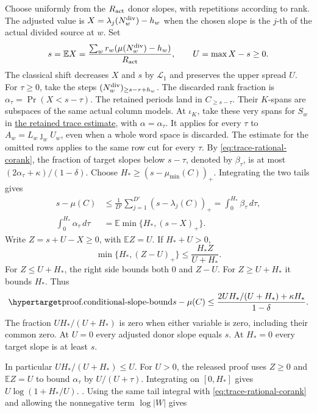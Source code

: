 \leavevmode{}%
Choose uniformly from the \(R_{\rm act}\) donor slopes, with repetitions
according to rank. The adjusted value is
\(X=\lambda_j(N_w^{\rm div})-h_w\) when the chosen slope is the \(j\)-th
of the actual divided source at \(w\). Set
\[
 s=\mathbb E X=\frac{\sum_w r_w(\mu(N_w^{\rm div})-h_w)}{R_{\rm act}},
 \qquad U=\max X-s\ge0 .
\]
The classical shift decreases \(X\) and \(s\) by \(\mathscr L_1\)
and preserves the upper spread \(U\).
For \(\tau\ge0\), take the steps \((N_w^{\rm div})_{\ge s-\tau+h_w}\).
The discarded rank fraction is \(\alpha_\tau=\Pr(X<s-\tau)\).
The retained periods land in \(C_{\ge s-\tau}\). Their \(K\)-spans
are subspaces of the same actual column models. At \(\iota_K\), take
these very spans for \(S_w\) in \hyperlink{proof.cut-frame-energy}{the
retained trace estimate}, with \(\alpha=\alpha_\tau\). It applies for every
\(\tau\) to \(A_w=L_w\jmath_wU_w\), even when a whole word space is
discarded. The estimate for the omitted rows applies to the same
row cut for every \(\tau\).
By \eqref{eq:trace-rational-corank}, the fraction of target slopes
below \(s-\tau\), denoted by \(\beta_\tau\), is at most
\((2\alpha_\tau+\kappa)/(1-\delta)\).
Choose \(H_*\ge (s-\mu_{\min}(C))_+\). Integrating the two tails gives
\[
 \begin{aligned}
 s-\mu(C)&\le \frac1{D'}\sum_{j=1}^{D'}(s-\lambda_j(C))_+
   =\int_0^{H_*}\beta_\tau\,d\tau,\\
 \int_0^{H_*}\alpha_\tau\,d\tau&=\mathbb E\min\{H_*,(s-X)_+\}.
 \end{aligned}
\]
Write \(Z=s+U-X\ge0\), with \(\mathbb E Z=U\). If \(H_*+U>0\),
\[
 \min\{H_*,(Z-U)_+\}\le \frac{H_* Z}{U+H_*}.
\]
For \(Z\le U+H_*\), the right side bounds both \(0\) and \(Z-U\).
For \(Z\ge U+H_*\) it bounds \(H_*\). Thus
\[
\teamanchor{proof.conditional-slope-bound}
 s-\mu(C)\le
 \frac{2UH_*/(U+H_*)+\kappa H_*}{1-\delta}.
\]
The fraction \(UH_*/(U+H_*)\) is zero when either variable is zero,
including their common zero. At \(U=0\) every adjusted donor slope
equals \(s\). At \(H_*=0\) every target slope is at least \(s\).

In particular \(UH_*/(U+H_*)\le U\). For \(U>0\), the released proof
uses \(Z\ge0\) and \(\mathbb E Z=U\) to bound \(\alpha_\tau\) by
\(U/(U+\tau)\). Integrating on \([0,H_*]\) gives
\(U\log(1+H_*/U)\).
.
Using the same tail integral with \eqref{eq:trace-rational-corank}
and allowing the nonnegative term \(\log|W|\) gives

